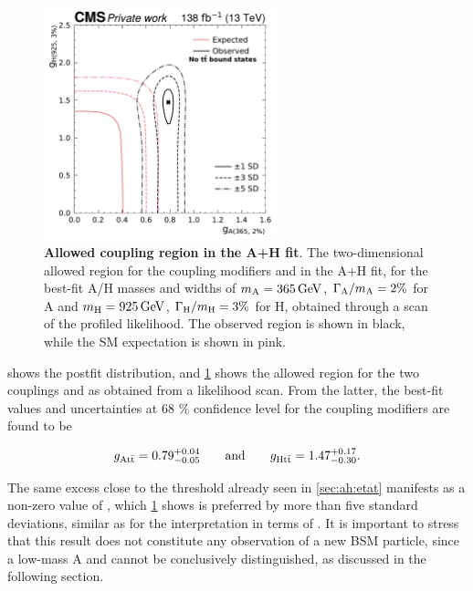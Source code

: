 \begin{figure}[!th]
    \centering
    \includegraphics[width=0.6\textwidth]{figures/ah/contour/A_m365_w2p0__H_m925_w3p0_nll_g1__g2_ll_noetat.pdf}
    \caption{
        \textbf{Allowed coupling region in the A+H fit}. The two-dimensional allowed region for the coupling modifiers \gAtt and \gHtt in the A+H fit, for the best-fit A/H masses and widths of $\mA = \SI{365}{\GeV}$, $\Gamma_{\mathrm{A}}/m_{\mathrm{A}} = 2\%$ for A and $\mH = \SI{925}{\GeV}$, $\Gamma_{\mathrm{H}}/m_{\mathrm{H}} = 3\%$ for H, obtained through a scan of the profiled likelihood. The observed region is shown in black, while the SM expectation is shown in pink.
    }
    \label{fig:ah:contour_ah_ll}
\end{figure}

 shows the postfit \mttchelchan distribution, and \cref{fig:ah:contour_ah_ll} shows the allowed region for the two couplings \gAtt and \gHtt as obtained from a likelihood scan. From the latter, the best-fit values and uncertainties at 68 \% confidence level for the coupling modifiers are found to be

\begin{equation}
\label{eq:ah:ahbestfit}
    g_{\mathrm{A t \bar{t}}} = 0.79^{+0.04}_{-0.05} \quad\quad \text{and} \quad\quad g_{\mathrm{H t \bar{t}}} = 1.47^{+0.17}_{-0.30}.
\end{equation}

The same excess close to the \ttbar threshold already seen in \cref{sec:ah:etat} manifests as a non-zero value of \gAtt, which \cref{fig:ah:contour_ah_ll} shows is preferred by more than five standard deviations, similar as for the interpretation in terms of \etat. It is important to stress that this result does not constitute any observation of a new BSM particle, since a low-mass A and \etat cannot be conclusively distinguished, as discussed in the following section.

